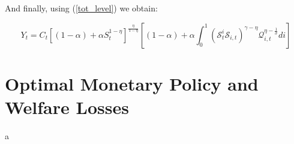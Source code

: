 \documentclass{article}
\begin{document}
And finally, using (\ref{tot_level}) we obtain:

\begin{equation}
    Y_{t} = C_t \left[(1-\alpha) + \alpha S_t^{1-\eta} \right]^{\frac{\eta}{1-\eta}} \left[(1-\alpha)  +  \alpha \int_0^1 \left(\mathcal S^i_t \mathcal S_{i,t} \right)^{\gamma - \eta} \mathcal Q^{\eta - \frac{1}{\sigma}}_{i,t} di \right] 
\end{equation}

\section{Optimal Monetary Policy and Welfare Losses}
a

\nocite{*}


\end{document}

